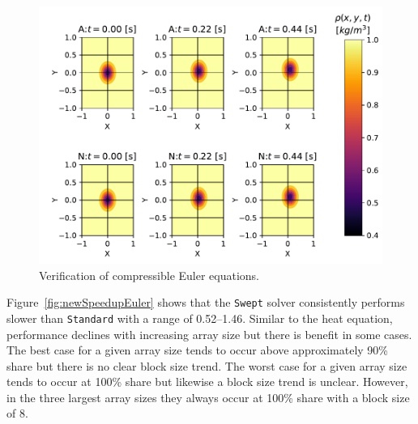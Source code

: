 \documentclass[mca,article,submit,moreauthors,pdftex]{Definitions/mdpi}
\def\Swept{\texttt{Swept}}
\def\Standard{\texttt{Standard}}
\begin{document}
\begin{figure}[htbp]
\widefigure
    \includegraphics[scale=0.85,trim={0.45cm 0.3cm 0.1cm 0.9cm},clip]{figs/eulerValidate.pdf}
    \caption{Verification of compressible Euler equations.}
    \label{fig:eulerSurface}
\end{figure}
\begin{paracol}{2}
\linenumbers
\switchcolumn

Figure~\ref{fig:newSpeedupEuler} shows that the \Swept{} solver consistently performs slower than \Standard{} with a range of 0.52--1.46. Similar to the heat equation, performance declines with increasing array size but there is benefit in some cases. The best case for a given array size tends to occur above approximately 90\% share but there is no clear block size trend. The worst case for a given array size tends to occur at 100\% share but likewise a block size trend is unclear. However, in the three largest array sizes they always occur at 100\% share with a block size of 8.

\end{paracol}
\nointerlineskip
\end{document}
